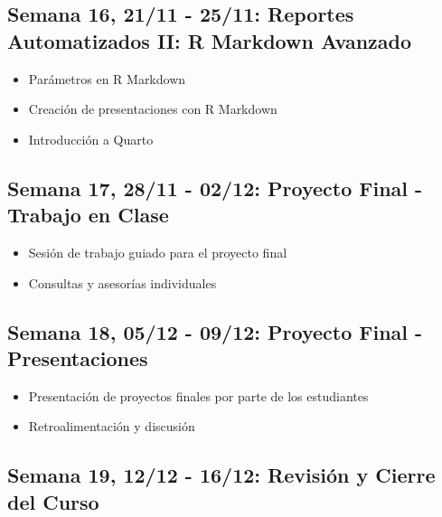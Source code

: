 \documentclass[11pt,letter,]{article}
\providecommand{\tightlist}{%
  \setlength{\itemsep}{0pt}\setlength{\parskip}{0pt}}
\begin{document}
\hypertarget{semana-16-2111---2511-reportes-automatizados-ii-r-markdown-avanzado}{%
\subsection{Semana 16, 21/11 - 25/11: Reportes Automatizados II: R
Markdown
Avanzado}\label{semana-16-2111---2511-reportes-automatizados-ii-r-markdown-avanzado}}

\begin{itemize}
\tightlist
\item
  Parámetros en R Markdown
\item
  Creación de presentaciones con R Markdown
\item
  Introducción a Quarto
\end{itemize}

\hypertarget{semana-17-2811---0212-proyecto-final---trabajo-en-clase}{%
\subsection{Semana 17, 28/11 - 02/12: Proyecto Final - Trabajo en
Clase}\label{semana-17-2811---0212-proyecto-final---trabajo-en-clase}}

\begin{itemize}
\tightlist
\item
  Sesión de trabajo guiado para el proyecto final
\item
  Consultas y asesorías individuales
\end{itemize}

\hypertarget{semana-18-0512---0912-proyecto-final---presentaciones}{%
\subsection{Semana 18, 05/12 - 09/12: Proyecto Final -
Presentaciones}\label{semana-18-0512---0912-proyecto-final---presentaciones}}

\begin{itemize}
\tightlist
\item
  Presentación de proyectos finales por parte de los estudiantes
\item
  Retroalimentación y discusión
\end{itemize}

\hypertarget{semana-19-1212---1612-revisiuxf3n-y-cierre-del-curso}{%
\subsection{Semana 19, 12/12 - 16/12: Revisión y Cierre del
Curso}\label{semana-19-1212---1612-revisiuxf3n-y-cierre-del-curso}}
\end{document}
